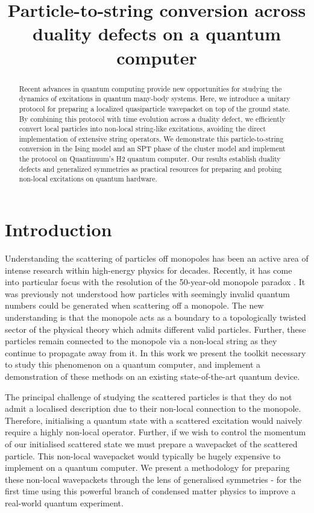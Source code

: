\documentclass[aps,floatfix,10pt,amssymb,amsfont,amsmath,superscriptaddress,float,nofootinbib,longbibliography,nobalancelastpage,twocolumn,prx]{revtex4-2}
\begin{document}
\title{Particle-to-string conversion across duality defects on a quantum computer}
\begin{abstract}
Recent advances in quantum computing provide new opportunities for studying the dynamics of excitations in quantum many-body systems. Here, we introduce a unitary protocol for preparing a localized quasiparticle wavepacket on top of the ground state. By combining this protocol with time evolution across a duality defect, we efficiently convert local particles into non-local string-like excitations, avoiding the direct implementation of extensive string operators. We demonstrate this particle-to-string conversion in the Ising model and an SPT phase of the cluster model and implement the protocol on Quantinuum's H2 quantum computer. Our results establish duality defects and generalized symmetries as practical resources for preparing and probing non-local excitations on quantum hardware.
\end{abstract}
\maketitle

\section{Introduction}

Understanding the scattering of particles off monopoles has been an active area of intense research within high-energy physics for decades. Recently, it has come into particular focus with the resolution of the 50-year-old monopole paradox \cite{}. It was previously not understood how particles with seemingly invalid quantum numbers could be generated when scattering off a monopole. The new understanding \cite{} is that the monopole acts as a boundary to a topologically twisted sector of the physical theory which admits different valid particles. Further, these particles remain connected to the monopole via a non-local string as they continue to propagate away from it. In this work we present the toolkit necessary to study this phenomenon on a quantum computer, and implement a demonstration of these methods on an existing state-of-the-art quantum device.

The principal challenge of studying the scattered particles is that they do not admit a localised description due to their non-local connection to the monopole. Therefore, initialising a quantum state with a scattered excitation would naively require a highly non-local operator. Further, if we wish to control the momentum of our initialised scattered state we must prepare a wavepacket of the scattered particle. This non-local wavepacket would typically be hugely expensive to implement on a quantum computer. We present a methodology for preparing these non-local wavepackets through the lens of generalised symmetries - for the first time using this powerful branch of condensed matter physics to improve a real-world quantum experiment.
\end{document}
